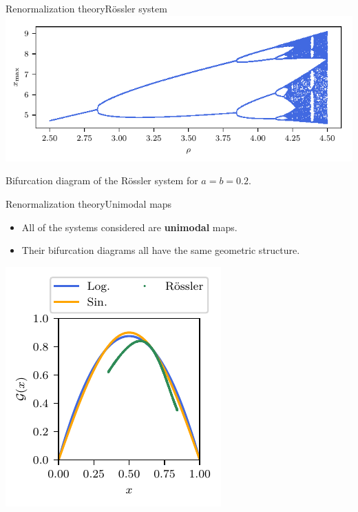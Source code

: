 \documentclass[usenames,dvipsnames,svgnames,10pt,aspectratio=169]{beamer}
\begin{document}
\begin{frame}[t, c]{Renormalization theory}{R\"ossler system}
	\centering
	\includegraphics[width=.75\textwidth]{rossler_bifurcation_diagram_zoom}

	Bifurcation diagram of the R\"ossler system for $a=b=0.2$.

	\vspace{1cm}
\end{frame}

\begin{frame}[t, c]{Renormalization theory}{Unimodal maps}
	\begin{minipage}{.48\textwidth}
		\begin{itemize}
			\item All of the systems considered are \alert{\textbf{unimodal}} maps.

			\bigskip

			\item Their bifurcation diagrams all have the same geometric structure.
		\end{itemize}

		\vspace{1cm}
	\end{minipage}%
	\hfill
	\begin{minipage}{.48\textwidth}
		\centering
		\includegraphics[width=.8\textwidth]{unimodal_maps}
	\end{minipage}

	\vspace{1cm}
\end{frame}
\end{document}
